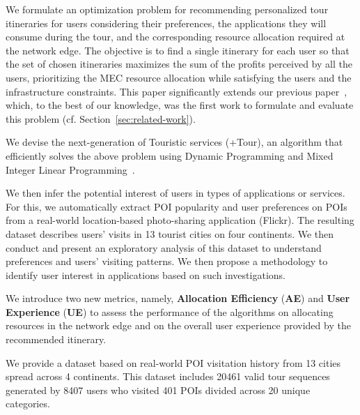 \begin{itemize}

\item We formulate an optimization problem for recommending personalized tour itineraries for users considering their preferences, the applications they will consume during the tour, and the corresponding resource allocation required at the network edge. The objective is to find a single itinerary for each user so that the set of chosen itineraries maximizes the sum of the profits perceived by all the users, prioritizing the MEC resource allocation while satisfying the users and the infrastructure constraints. This paper significantly extends our previous paper~\cite{fonseca-personlized:19}, which, to the best of our knowledge,
was the first work to formulate {and evaluate} this problem (cf. Section~\ref{sec:related-work}). 

\item We devise the next-generation of Touristic services (+Tour), an algorithm that efficiently solves the above problem using {Dynamic Programming and Mixed Integer Linear Programming~\cite{hillier2015introduction}}. 

\item We then infer the potential interest of users in types of applications or services. For this, we automatically extract POI popularity and user preferences on POIs from a real-world location-based photo-sharing application (Flickr). The resulting dataset describes users' visits in 13 tourist cities on four continents. We then conduct and present an exploratory analysis of this dataset to understand preferences and users' visiting patterns. We then propose a methodology to identify user interest in applications based on such investigations.

{\item We introduce two new metrics, namely, \textbf{Allocation Efficiency} (\textbf{AE}) and \textbf{User Experience} (\textbf{UE}) to assess the performance of the algorithms on allocating resources in the network edge and on the overall user experience provided by the recommended itinerary.}

{\item We provide a dataset based on real-world POI visitation history from 13 cities spread across 4 continents. This dataset includes 20461 valid tour sequences generated by 8407 users who visited 401 POIs divided across 20 unique categories.}


\end{itemize}
